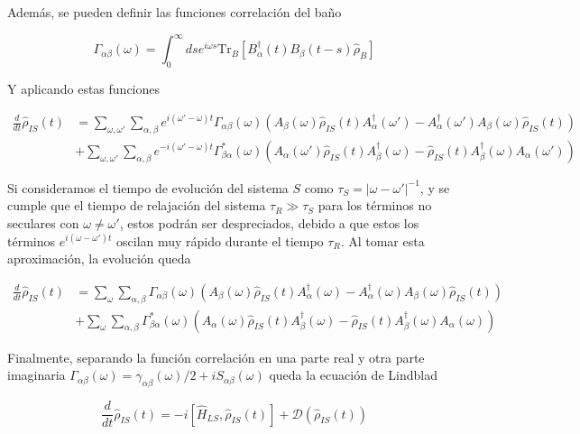 Además, se pueden definir las funciones correlación del baño

\begin{equation*}
    \Gamma_{\alpha\beta}(\omega) = \int_{0}^{\infty}ds e^{i\omega s}\text{Tr}_{B}[B^{\dagger}_{\alpha}(t)B_{\beta}(t-s)\hat{\rho}_{B}]
\end{equation*}

Y aplicando estas funciones

\begin{align*}
    \frac{d}{dt}\hat{\rho}_{IS}(t) & = \sum_{\omega,\omega'}\sum_{\alpha,\beta} e^{i(\omega'- \omega)t}\Gamma_{\alpha \beta}(\omega)\left(A_{\beta}(\omega)\hat{\rho}_{IS}(t)A^{\dagger}_{\alpha}(\omega') - A^{\dagger}_{\alpha}(\omega')A_{\beta}(\omega) \hat{\rho}_{IS}(t) \right) \\
    & + \sum_{\omega,\omega'}\sum_{\alpha,\beta} e^{-i(\omega'- \omega)t}\Gamma^{*}_{\beta \alpha}(\omega) \left(A_{\alpha}(\omega')\hat{\rho}_{IS}(t)A^{\dagger}_{\beta}(\omega) - \hat{\rho}_{IS}(t)A^{\dagger}_{\beta}(\omega)A_{\alpha}(\omega') \right)
\end{align*}

Si consideramos el tiempo de evolución del sistema $S$ como $\tau_{S}=|\omega-\omega'|^{-1}$, y se cumple que el tiempo de relajación del sistema $\tau_{R}\gg \tau_{S}$ para los términos no seculares con $\omega \neq \omega'$, estos podrán ser despreciados, debido a que estos los términos $e^{i(\omega-\omega')t}$ oscilan muy rápido durante el tiempo $\tau_{R}$. Al tomar esta aproximación, la evolución queda

\begin{align*}
    \frac{d}{dt}\hat{\rho}_{IS}(t) & = \sum_{\omega}\sum_{\alpha,\beta} \Gamma_{\alpha \beta}(\omega)\left(A_{\beta}(\omega)\hat{\rho}_{IS}(t)A^{\dagger}_{\alpha}(\omega) - A^{\dagger}_{\alpha}(\omega)A_{\beta}(\omega) \hat{\rho}_{IS}(t) \right) \\
    & + \sum_{\omega}\sum_{\alpha,\beta} \Gamma^{*}_{\beta \alpha}(\omega) \left(A_{\alpha}(\omega)\hat{\rho}_{IS}(t)A^{\dagger}_{\beta}(\omega) - \hat{\rho}_{IS}(t)A^{\dagger}_{\beta}(\omega)A_{\alpha}(\omega) \right)
\end{align*}

Finalmente, separando la función correlación en una parte real y otra parte imaginaria $\Gamma_{\alpha \beta}(\omega) = \gamma_{\alpha \beta}(\omega)/2 + iS_{\alpha \beta}(\omega)$ queda la ecuación de Lindblad 

\begin{equation}
    \frac{d}{dt} \hat{\rho}_{IS}(t) = -i[\hat{H}_{LS},\hat{\rho}_{IS}(t)] + \mathcal{D}(\hat{\rho}_{IS}(t))
    \label{seclindbladfinal}
\end{equation}

